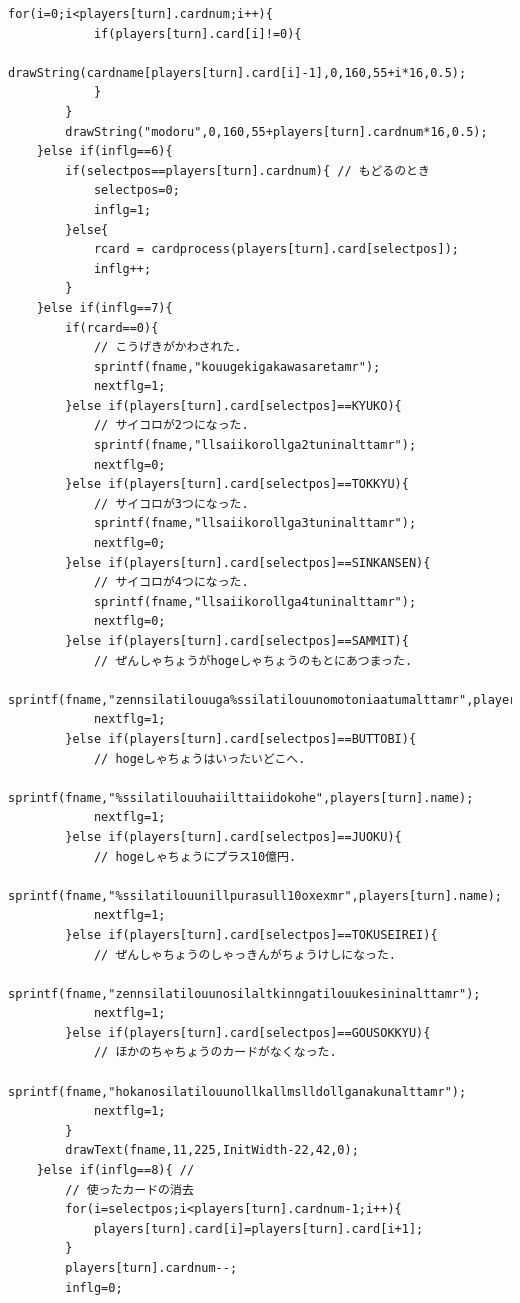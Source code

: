 \documentclass[a4j]{jarticle}
\begin{document}
\begin{lstlisting}[basicstyle=\ttfamily\footnotesize, frame=single,label=code2,caption=game.c]
        for(i=0;i<players[turn].cardnum;i++){
            if(players[turn].card[i]!=0){
                drawString(cardname[players[turn].card[i]-1],0,160,55+i*16,0.5);                   
            }
        }
        drawString("modoru",0,160,55+players[turn].cardnum*16,0.5);
    }else if(inflg==6){
        if(selectpos==players[turn].cardnum){ // もどるのとき
            selectpos=0;
            inflg=1;
        }else{
            rcard = cardprocess(players[turn].card[selectpos]);
            inflg++;
        }
    }else if(inflg==7){
        if(rcard==0){
            // こうげきがかわされた.
            sprintf(fname,"kouugekigakawasaretamr");
            nextflg=1;
        }else if(players[turn].card[selectpos]==KYUKO){
            // サイコロが2つになった.
            sprintf(fname,"llsaiikorollga2tuninalttamr");
            nextflg=0;
        }else if(players[turn].card[selectpos]==TOKKYU){
            // サイコロが3つになった.
            sprintf(fname,"llsaiikorollga3tuninalttamr");
            nextflg=0;
        }else if(players[turn].card[selectpos]==SINKANSEN){
            // サイコロが4つになった.
            sprintf(fname,"llsaiikorollga4tuninalttamr");
            nextflg=0;
        }else if(players[turn].card[selectpos]==SAMMIT){
            // ぜんしゃちょうがhogeしゃちょうのもとにあつまった.
            sprintf(fname,"zennsilatilouuga%ssilatilouunomotoniaatumalttamr",players[turn].name);
            nextflg=1;
        }else if(players[turn].card[selectpos]==BUTTOBI){
            // hogeしゃちょうはいったいどこへ.
            sprintf(fname,"%ssilatilouuhaiilttaiidokohe",players[turn].name);
            nextflg=1;
        }else if(players[turn].card[selectpos]==JUOKU){
            // hogeしゃちょうにプラス10億円.
            sprintf(fname,"%ssilatilouunillpurasull10oxexmr",players[turn].name);
            nextflg=1;
        }else if(players[turn].card[selectpos]==TOKUSEIREI){
            // ぜんしゃちょうのしゃっきんがちょうけしになった.
            sprintf(fname,"zennsilatilouunosilaltkinngatilouukesininalttamr");
            nextflg=1;
        }else if(players[turn].card[selectpos]==GOUSOKKYU){
            // ほかのちゃちょうのカードがなくなった.
            sprintf(fname,"hokanosilatilouunollkallmslldollganakunalttamr");
            nextflg=1;
        }
        drawText(fname,11,225,InitWidth-22,42,0);      
    }else if(inflg==8){ // 
        // 使ったカードの消去
        for(i=selectpos;i<players[turn].cardnum-1;i++){
            players[turn].card[i]=players[turn].card[i+1];
        }
        players[turn].cardnum--;
        inflg=0;

\end{lstlisting}
\end{document}
